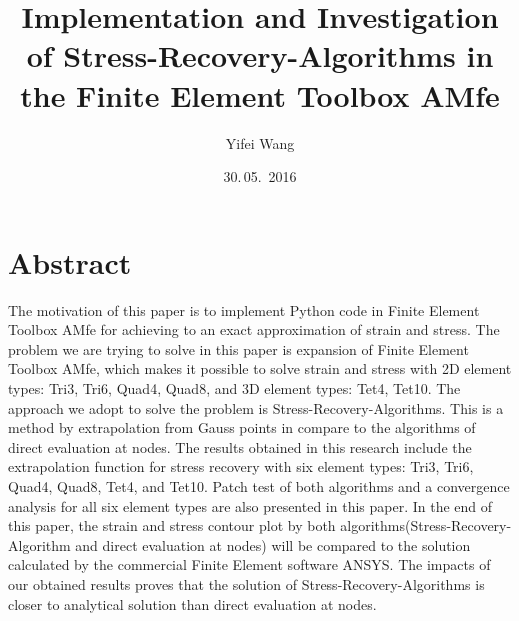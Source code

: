 \documentclass[nenglish]{AMsemesterArbeit}
\author{Yifei Wang}
\title{%
	Implementation and Investigation of Stress-Recovery-Algorithms in the Finite Element Toolbox AMfe
	}
\date{30.\,05.~2016}
\begin{document}
\renewcommand{\arraystretch}{2}
\frontmatter
\maketitle
\section*{Abstract}
The motivation of this paper is to implement Python code in Finite Element Toolbox AMfe for achieving to an exact approximation of strain and stress. The problem we are trying to solve in this paper is expansion of Finite Element Toolbox AMfe, which makes it possible to solve strain and stress with 2D element types: Tri3, Tri6, Quad4, Quad8, and 3D element types: Tet4, Tet10. The approach we adopt to solve the problem is Stress-Recovery-Algorithms. This is a method by extrapolation from Gauss points in compare to the algorithms of direct evaluation at nodes. The results obtained in this research include the extrapolation function for stress recovery with six element types: Tri3, Tri6, Quad4, Quad8, Tet4, and Tet10. Patch test of both algorithms and a convergence analysis for all six element types are also presented in this paper. In the end of this paper, the strain and stress contour plot by both algorithms(Stress-Recovery-Algorithm and direct evaluation at nodes) will be compared to the solution calculated by the commercial Finite Element software ANSYS. The impacts of our obtained results proves that the solution of Stress-Recovery-Algorithms is closer to analytical solution than direct evaluation at nodes.  



\PrintTablesAndListsOfContents
\mainmatter

\backmatter
\AMPrintBibliography
\end{document}
